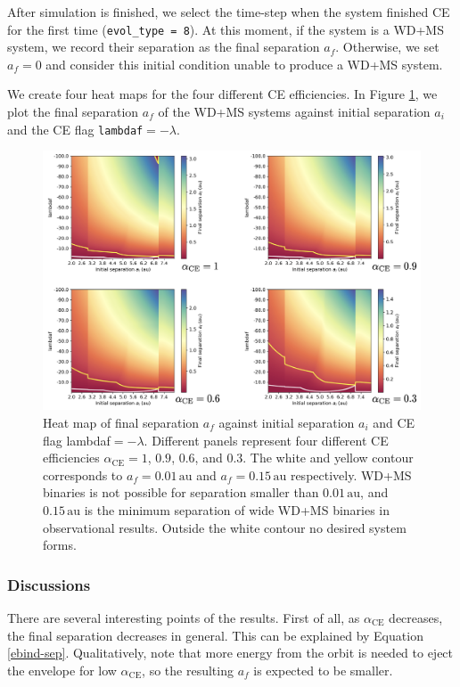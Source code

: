 \documentclass[linenumbers]{aastex631}
\newcommand{\alphace}{\alpha_{\mathrm{CE}}}
\newcommand{\au}{\, \mathrm{au}}
\begin{document}
After simulation is finished, we select the time-step when the system finished CE for the first time (\verb|evol_type = 8|). At this moment, if the system is a WD+MS system, we record their separation as the final separation $a_f$. Otherwise, we set $a_f = 0$ and consider this initial condition unable to produce a WD+MS system.

We create four heat maps for the four different CE efficiencies. In Figure \ref{res_hi}, we plot the final separation $a_f$ of the WD+MS systems against initial separation $a_i$ and the CE flag \verb|lambdaf|$= - \lambda$.

\begin{figure}
	\centering
	\includegraphics[width=0.8\linewidth]{7+1results.png}
	\caption{ Heat map of final separation $a_f$ against initial separation $a_i$ and CE flag lambdaf$=-\lambda$. Different panels represent four different CE efficiencies $\alphace = 1$, $0.9$, $0.6$, and $0.3$. The white and yellow contour corresponds to $a_f = 0.01 \au$ and $a_f = 0.15 \au$ respectively. WD+MS binaries is not possible for separation smaller than $0.01 \au$, and $0.15 \au$ is the minimum separation of wide WD+MS binaries in observational results. Outside the white contour no desired system forms.}
	\label{res_hi}
\end{figure}

\subsubsection{Discussions}

There are several interesting points of the results. First of all, as $\alphace$ decreases, the final separation decreases in general. This can be explained by Equation \ref{ebind-sep}. Qualitatively, note that more energy from the orbit is needed to eject the envelope for low $\alphace$, so the resulting $a_f$ is expected to be smaller. 
\end{document}
